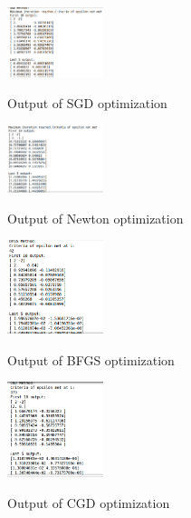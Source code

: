 \documentclass[paper=a4, fontsize=11pt]{scrartcl}
\numberwithin{equation}{section}		%
\numberwithin{figure}{section}			%
\numberwithin{table}{section}				%
\begin{document}
\begin{figure}[H]
\caption{Output of SGD optimization}
\centering
\includegraphics[width=0.25\textwidth]{out7.png}
\label{out7}
\end{figure}
\begin{figure}[H]
\caption{Output of Newton optimization}
\centering
\includegraphics[width=0.25\textwidth]{out8.png}
\label{out8}
\end{figure}
\begin{figure}[H]
\caption{Output of BFGS optimization}
\centering
\includegraphics[width=0.25\textwidth]{out9.png}
\label{out9}
\end{figure}
\begin{figure}[H]
\caption{Output of CGD optimization}
\centering
\includegraphics[width=0.25\textwidth]{out10.png}
\label{out10}
\end{figure}
\end{document}
